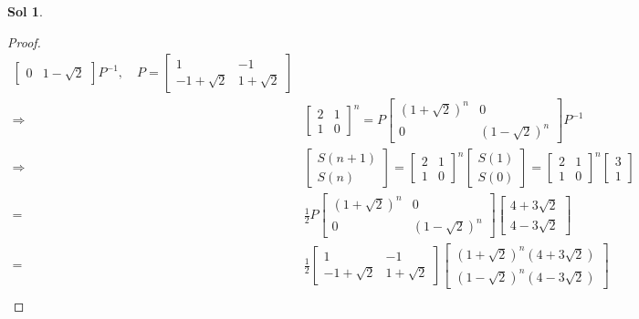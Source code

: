 \documentclass[12pt,a4paper]{report}
\theoremstyle{definition}
\newtheorem*{sol}{Sol}
\begin{document}
\begin{sol}
\begin{proof}
\begin{align*}
\begin{bmatrix}
	    0 & 1-\sqrt{2}
	    \end{bmatrix}P^{-1},\quad P=\begin{bmatrix}
	    1 & -1\\
	    -1+\sqrt{2} & 1+\sqrt{2}
	    \end{bmatrix}\\
	    \Rightarrow & \begin{bmatrix}
	    2 & 1\\
	    1 & 0
	    \end{bmatrix}^n=P\begin{bmatrix}
	    (1+\sqrt{2})^n & 0\\
	    0 & (1-\sqrt{2})^n
	    \end{bmatrix}P^{-1}\\
	    \Rightarrow &\begin{bmatrix}
	    S(n+1)\\
	    S(n)
	    \end{bmatrix}=\begin{bmatrix}
	    2 & 1\\
	    1 & 0
	    \end{bmatrix}^n\begin{bmatrix}
	    S(1)\\
	    S(0)
	    \end{bmatrix}=\begin{bmatrix}
	    2 & 1\\
	    1 & 0
	    \end{bmatrix}^n\begin{bmatrix}
	    3\\
	    1
	    \end{bmatrix}\\
	    =& \frac{1}{2}P\begin{bmatrix}
	    (1+\sqrt{2})^n & 0\\
	    0 & (1-\sqrt{2})^n
	    \end{bmatrix}\begin{bmatrix}
	    4+3\sqrt{2}\\
	    4-3\sqrt{2}
	    \end{bmatrix}\\
	    =& \frac{1}{2}\begin{bmatrix}
	    1 & -1\\
	    -1+\sqrt{2} & 1+\sqrt{2}
	    \end{bmatrix}\begin{bmatrix}
	    (1+\sqrt{2})^n(4+3\sqrt{2})\\
	    (1-\sqrt{2})^n(4-3\sqrt{2})
	    \end{bmatrix}\\

\end{align*}
\end{proof}
\end{sol}
\end{document}
